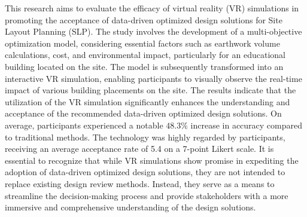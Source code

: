 This research aims to evaluate the efficacy of virtual reality (VR) simulations in promoting the acceptance of data-driven optimized design solutions for Site Layout Planning (SLP). The study involves the development of a multi-objective optimization model, considering essential factors such as earthwork volume calculations, cost, and environmental impact, particularly for an educational building located on the site. The model is subsequently transformed into an interactive VR simulation, enabling participants to visually observe the real-time impact of various building placements on the site. The results indicate that the utilization of the VR simulation significantly enhances the understanding and acceptance of the recommended data-driven optimized design solutions. On average, participants experienced a notable \(48.3\%\) increase in accuracy compared to traditional methods. The technology was highly regarded by participants, receiving an average acceptance rate of 5.4 on a 7-point Likert scale. It is essential to recognize that while VR simulations show promise in expediting the adoption of data-driven optimized design solutions, they are not intended to replace existing design review methods. Instead, they serve as a means to streamline the decision-making process and provide stakeholders with a more immersive and comprehensive understanding of the design solutions.

        
